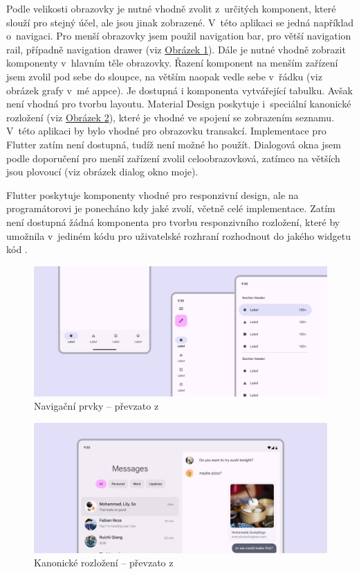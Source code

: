\documentclass[
  biblatex,
  figures=true,
  tables=false,
  glossaries,
  index
]{kidiplom}
\begin{document}
Podle velikosti obrazovky je nutné vhodně zvolit z~určitých komponent, které slouží pro stejný účel, ale jsou jinak zobrazené. V~této aplikaci se jedná například o~navigaci. Pro menší obrazovky jsem použil navigation bar, pro větší navigation rail, případně navigation drawer (viz \hyperref[fig:navigation]{Obrázek \ref{fig:navigation}}). Dále je nutné vhodně zobrazit komponenty v~hlavním těle obrazovky. Řazení komponent na menším zařízení jsem zvolil pod sebe do sloupce, na větším naopak vedle sebe v~řádku (viz obrázek grafy v~mé appce). Je dostupná i komponenta  vytvářející tabulku. Avšak není vhodná pro tvorbu layoutu. Material Design poskytuje i~speciální kanonické rozložení (viz \hyperref[fig:canonical-layout]{Obrázek \ref{fig:canonical-layout}}), které je vhodné ve spojení se zobrazením seznamu. V~této aplikaci by bylo vhodné pro obrazovku transakcí. Implementace pro Flutter zatím není dostupná, tudíž není možné ho použít. Dialogová okna jsem podle doporučení pro menší zařízení zvolil celoobrazovková, zatímco na větších jsou plovoucí (viz obrázek dialog okno moje).

Flutter poskytuje komponenty vhodné pro responzivní design, ale na programátorovi je ponecháno kdy jaké zvolí, včetně celé implementace. Zatím není dostupná žádná komponenta pro tvorbu responzivního rozložení, které by umožnila v~jediném kódu pro uživatelské rozhraní rozhodnout do jakého widgetu kód .

\begin{figure}
  \centering 
  \includegraphics[width=\textwidth]{images/navigation1.png}
  \caption{Navigační prvky -- převzato z~\cite{layout-m3}}
  \label{fig:navigation}
\end{figure}

\begin{figure}
  \centering 
  \includegraphics[width=\textwidth]{images/canonical-layout.png}
  \caption{Kanonické rozložení -- převzato z~\cite{m3}}
  \label{fig:canonical-layout}
\end{figure}
\end{document}
